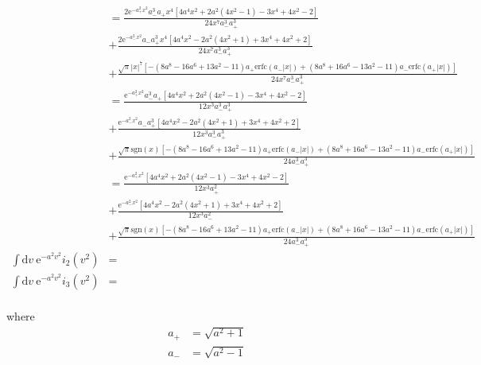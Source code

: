 \documentclass[paper=a4, fontsize=11pt]{article} %
\numberwithin{equation}{section} %
\numberwithin{figure}{section} %
\numberwithin{table}{section} %
\newcommand{\re}{{\mathrm{e}}}
\newcommand{\rerfc}{{\mathrm{erfc}}}
\newcommand{\rd}{{\mathrm{d}}}
\begin{document}
\begin{equation}
\begin{split}
&= \frac{2 \re^{-a_{+}^2 x^2} a_{-}^3 a_{+} x^4 \left[4 a^4 x^2 + 2a^2 (4 x^2 - 1) - 3 x^4 + 4 x^2 - 2\right] }{24 x^7 a_{-}^3 a_{+}^3}\\
&+ \frac{2 \re^{-a_{-}^2 x^2} a_{-} a_{+}^3 x^4 \left[4 a^4 x^2 - 2 a^2 (4 x^2 + 1) + 3 x^4 + 4 x^2 + 2\right]}{24 x^7 a_{-}^3 a_{+}^3}\\
&+ \frac{\sqrt{\pi} |x|^7 \left[-(8 a^8 - 16 a^6 + 13 a^2 - 11) a_{+} \rerfc(a_{-} |x|) + (8 a^8 + 16 a^6 - 13 a^2 - 11) a_{-}\rerfc(a_{+} |x|)\right]}{24 x^7 a_{-}^3 a_{+}^3}\\
&= \frac{ \re^{-a_{+}^2 x^2} a_{-}^3 a_{+} \left[4 a^4 x^2 + 2a^2 (4 x^2 - 1) - 3 x^4 + 4 x^2 - 2\right] }{12 x^3 a_{-}^3 a_{+}^3}\\
&+ \frac{ \re^{-a_{-}^2 x^2} a_{-} a_{+}^3 \left[4 a^4 x^2 - 2 a^2 (4 x^2 + 1) + 3 x^4 + 4 x^2 + 2\right]}{12 x^3 a_{-}^3 a_{+}^3}\\
&+ \frac{\sqrt{\pi} \mathrm{sgn}(x) \left[-(8 a^8 - 16 a^6 + 13 a^2 - 11) a_{+} \rerfc(a_{-} |x|) + (8 a^8 + 16 a^6 - 13 a^2 - 11) a_{-}\rerfc(a_{+} |x|)\right]}{24 a_{-}^3 a_{+}^3}\\
&= \frac{ \re^{-a_{+}^2 x^2} \left[4 a^4 x^2 + 2a^2 (4 x^2 - 1) - 3 x^4 + 4 x^2 - 2\right] }{12 x^3 a_{+}^2}\\
&+ \frac{ \re^{-a_{-}^2 x^2} \left[4 a^4 x^2 - 2 a^2 (4 x^2 + 1) + 3 x^4 + 4 x^2 + 2\right]}{12 x^3 a_{-}^2}\\
&+ \frac{\sqrt{\pi} \mathrm{sgn}(x) \left[-(8 a^8 - 16 a^6 + 13 a^2 - 11) a_{+} \rerfc(a_{-} |x|) + (8 a^8 + 16 a^6 - 13 a^2 - 11) a_{-}\rerfc(a_{+} |x|)\right]}{24 a_{-}^3 a_{+}^3}\\
\int \rd v\ \re^{-a^2 v^2}i_{2}(v^2)
&= \\
\int \rd v\ \re^{-a^2 v^2}i_{3}(v^2)
&= \\
\end{split}
\end{equation}

where
\begin{equation}
\begin{split}
a_{+} &= \sqrt{a^2+1}\\
a_{-} &= \sqrt{a^2-1}\\
\end{split}
\end{equation}

\newpage
\end{document}
